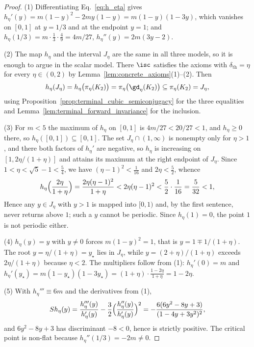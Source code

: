 \documentclass{article}
\begin{document}
\begin{proof}
(1) Differentiating Eq.~\eqref{eq:h_eta} gives
$h_\eta'(y)=m(1-y)^2-2my(1-y)=m(1-y)(1-3y)$, which vanishes on $[0,1]$ at
$y=1/3$ and at the endpoint $y=1$; and $h_\eta(1/3)=m\cdot\frac13\cdot\frac49=4m/27$,
$h_\eta''(y)=2m(3y-2)$.

(2) The map $h_\eta$ and the interval $J_\eta$ are the same in all three models,
so it is enough to argue in the scalar model. There $\isc$ satisfies the
axioms with $\delta_{\mathrm{th}}=\eta$ for every $\eta\in(0,2)$ by
Lemma~\ref{lem:concrete_axioms}(1)--(2). Then
\begin{align}
    h_\eta(J_\eta)
    =
    h_\eta\bigl(\pi_\eta(K_2)\bigr)
    =
    \pi_\eta\bigl(\gd_\eta(K_2)\bigr)
    \subseteq
    \pi_\eta(K_2)
    =
    J_\eta ,
\end{align}
using Proposition~\ref{prop:terminal_cubic_semiconjugacy} for the three
equalities and Lemma~\ref{lem:terminal_forward_invariance} for the inclusion.

(3) For $m<5$ the maximum of $h_\eta$ on $[0,1]$ is $4m/27<20/27<1$, and
$h_\eta\ge0$ there, so $h_\eta([0,1])\subseteq[0,1]$. The set $J_\eta\cap(1,\infty)$ is
nonempty only for $\eta>1$, and there both factors of $h_\eta'$ are negative, so
$h_\eta$ is increasing on $[1,2\eta/(1+\eta)]$ and attains its maximum at the
right endpoint of $J_\eta$.
Since $1<\eta<\sqrt5-1<\tfrac54$, we have
$(\eta-1)^2<\tfrac1{16}$ and $2\eta<\tfrac52$, whence
\begin{align}
    h_\eta\Bigl(\frac{2\eta}{1+\eta}\Bigr)
    =\frac{2\eta(\eta-1)^2}{1+\eta}
    <2\eta(\eta-1)^2
    <\frac52\cdot\frac1{16}
    =\frac5{32}<1,
\end{align}
Hence any $y\in J_\eta$ with
$y>1$ is mapped into $[0,1)$ and, by the first sentence, never returns above
$1$; such a $y$ cannot be periodic. Since $h_\eta(1)=0$, the point $1$ is not
periodic either.

(4) $h_\eta(y)=y$ with $y\ne0$ forces $m(1-y)^2=1$, that is $y=1\mp1/(1+\eta)$.
The root $y=\eta/(1+\eta)=y_\star$ lies in $J_\eta$, while
$y=(2+\eta)/(1+\eta)$ exceeds $2\eta/(1+\eta)$ because $\eta<2$. The
multipliers follow from (1): $h_\eta'(0)=m$ and
$h_\eta'(y_\star)=m(1-y_\star)(1-3y_\star)=(1+\eta)\cdot\frac{1-2\eta}{1+\eta}=1-2\eta$.

(5) With $h_\eta'''\equiv6m$ and the derivatives from (1),
\begin{align}
    Sh_\eta(y)
    =
    \frac{h_\eta'''(y)}{h_\eta'(y)}
    -\frac32\Bigl(\frac{h_\eta''(y)}{h_\eta'(y)}\Bigr)^2
    =
    -\frac{6(6y^2-8y+3)}{(1-4y+3y^2)^2},
\end{align}
and $6y^2-8y+3$ has discriminant $-8<0$, hence is strictly positive. The
critical point is non-flat because $h_\eta''(1/3)=-2m\ne0$.
\end{proof}
\end{document}
